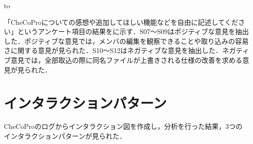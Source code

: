 \begin{table}[tb] 
\caption{CheCoProについての感想} 
\label{tab:free2}
\hbox to
\end{table}


「CheCoProについての感想や追加してほしい機能などを自由に記述してください」というアンケート項目の結果をに示す．S07〜S09はポジティブな意見を抽出した．ポジティブな意見では，メンバの編集を観察できることや取り込みの容易さに関する意見が見られた．S10〜S12はネガティブな意見を抽出した．ネガティブ意見では，全部取込の際に同名ファイルが上書きされる仕様の改善を求める意見が見られた．


\section{インタラクションパターン}

CheCoProのログからインタラクション図を作成し，分析を行った結果，3つのインタラクションパターンが見られた．


